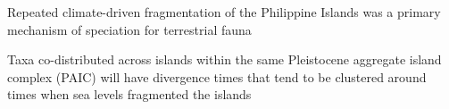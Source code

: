 \begin{frame}
    \begin{description}
        \item<1->[``Species-pump'' Hypothesis] 
            Repeated climate-driven fragmentation of the Philippine Islands was
            a primary mechanism of speciation for terrestrial fauna
        \item<2->[Prediction]
            Taxa co-distributed across islands within the same Pleistocene
            aggregate island complex (PAIC) will have divergence times that
            tend to be clustered around times when sea levels fragmented the
            islands
    \end{description}
\end{frame}
